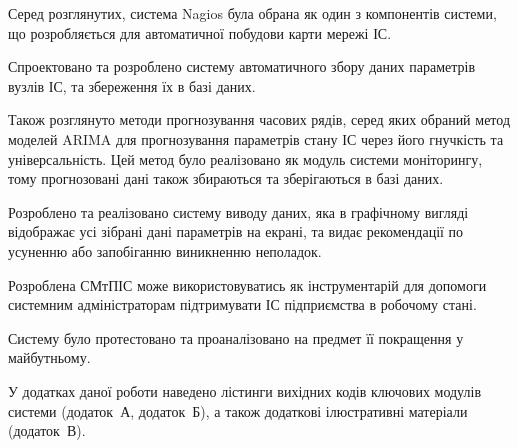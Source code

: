 \documentclass{thesis_utf8}
\begin{document}
Серед розглянутих, система Nagios була обрана як один з компонентів системи, що розробляється для автоматичної побудови карти мережі ІС.

Спроектовано та розроблено систему автоматичного збору даних параметрів вузлів ІС, та збереження їх в базі даних.

Також розглянуто методи прогнозування часових рядів, серед яких обраний метод моделей ARIMA для прогнозування параметрів стану ІС через його гнучкість та універсальність.
Цей метод було реалізовано як модуль системи моніторингу, тому прогнозовані дані також збираються та зберігаються в базі даних.

Розроблено та реалізовано систему виводу даних, яка в графічному вигляді відображає усі зібрані дані параметрів на екрані, та видає рекомендації по усуненню або запобіганню виникненню неполадок.

Розроблена СМтПІС може використовуватись як інструментарій для допомоги системним адміністраторам підтримувати ІС підприємства в робочому стані.

Систему було протестовано та проаналізовано на предмет її покращення у майбутньому.

У додатках даної роботи наведено лістинги вихідних кодів ключових модулів системи (додаток~А, додаток~Б), а також додаткові ілюстративні матеріали (додаток~В).
\end{document}
